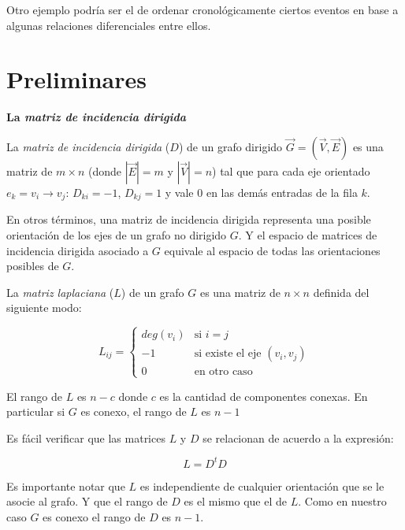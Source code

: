 \documentclass[10pt, a4paper, twocolumn]{article} %
\begin{document}
Otro ejemplo podría ser el de ordenar cronológicamente ciertos eventos 
en base a algunas relaciones diferenciales entre ellos.


\section{Preliminares}

\textbf{La \textit{matriz de incidencia dirigida}}

\smallskip

La \textit{matriz de incidencia dirigida} ($D$) de un grafo dirigido 
$\vec G = (\vec V, \vec E)$ es una matriz de $m \times n$ (donde $|\vec
 E| = m$ y $|\vec V| = n$) tal que para cada eje orientado 
$e_k=v_i \rightarrow v_j$: $D_{ki} = -1$, $D_{kj} = 1$ y vale $0$ en 
las demás entradas de la fila $k$.

\smallskip

En otros términos, una matriz de incidencia dirigida representa una 
posible orientación de los ejes de un grafo no dirigido $G$. Y el 
espacio de matrices de incidencia dirigida asociado a $G$ 
equivale al espacio de todas las orientaciones posibles de $G$.

\bigskip


La \textit{matriz laplaciana} ($L$) de un grafo $G$ es una matriz de 
$n \times n$ definida del siguiente modo:

$$
	L_{ij} =
	\begin{cases}
	deg(v_i) & \text{si $i = j$} \\
	-1 & \text{si existe el eje $(v_i,v_j)$} \\
	0 & \text{en otro caso} 
	\end{cases}
$$

El rango de $L$ es $n-c$ donde $c$ es la cantidad de componentes 
conexas. En particular si $G$ es conexo, el rango de $L$ es $n-1$

\bigskip


Es fácil verificar que las matrices $L$ y $D$ se relacionan de acuerdo
a la expresión:

$$L = D^t D$$

Es importante notar que $L$ es independiente de cualquier orientación 
que se le asocie al grafo. Y que el rango de $D$ es el mismo que el de 
$L$. Como en nuestro caso $G$ es conexo el rango de $D$ es $n-1$.
\end{document}

